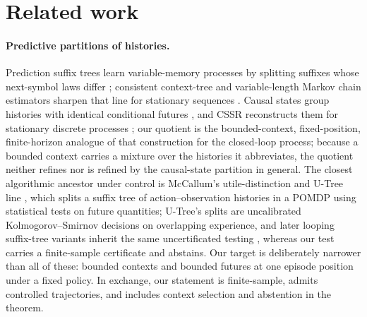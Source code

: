 \documentclass{article}
\begin{document}
\section{Related work}

\paragraph{Predictive partitions of histories.}
Prediction suffix trees learn variable-memory processes by splitting suffixes
whose next-symbol laws differ \citep{ron1996power}; consistent context-tree
and variable-length Markov chain estimators sharpen that line for stationary
sequences \citep{buhlmann1999variable,csiszar2006context}.  Causal states group
histories with identical conditional futures
\citep{crutchfield1989inferring,shalizi2001computational}, and CSSR
reconstructs them for stationary discrete processes \citep{shalizi2004blind};
our quotient is the bounded-context, fixed-position, finite-horizon
analogue of that construction for the closed-loop process; because a bounded
context carries a mixture over the histories it abbreviates, the quotient
neither refines nor is refined by the causal-state partition in general.  The closest algorithmic
ancestor under control is McCallum's utile-distinction and U-Tree line
\citep{mccallum1995instance,mccallum1996reinforcement}, which splits a suffix
tree of action--observation histories in a POMDP using statistical tests on
future quantities; U-Tree's splits are uncalibrated
Kolmogorov--Smirnov decisions on overlapping experience, and later looping
suffix-tree variants inherit the same uncertificated testing
\citep{holmes2006looping}, whereas our test
carries a finite-sample certificate and abstains.  Our target is
deliberately narrower than all of these: bounded contexts and bounded futures
at one episode position under a fixed policy.  In exchange, our statement is
finite-sample, admits controlled trajectories, and includes context
selection and abstention in the theorem.
\end{document}
